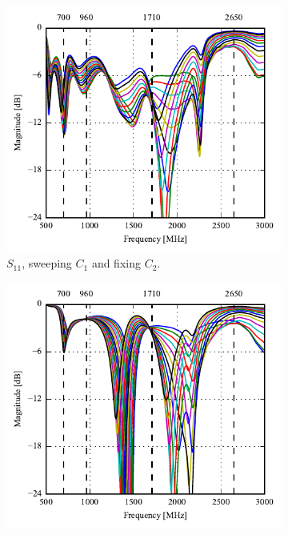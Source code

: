 \begin{figure}[htbp]
   \begin{subfigure}[b]{0.49\linewidth}
        \centering
        \includegraphics{img/tech_sol/monopole/data_mode/s11}
        \caption{$S_{11}$, sweeping $C_1$ and fixing $C_2$.}
    \end{subfigure}
    \hfill
    \begin{subfigure}[b]{0.49\linewidth}
        \centering
        \includegraphics{img/tech_sol/monopole/data_mode/s22}

\end{subfigure}
\end{figure}
